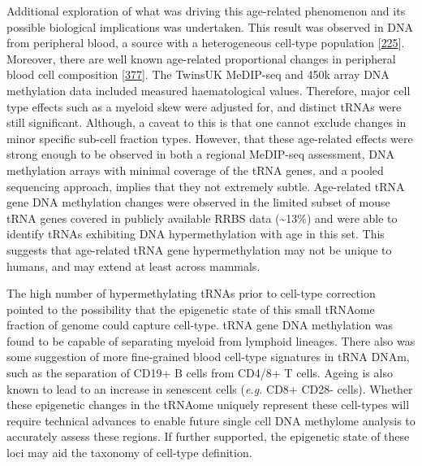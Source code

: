 \documentclass[
]{book}
\begin{document}
Additional exploration of what was driving this age-related phenomenon and its possible biological implications was undertaken.
This result was observed in DNA from peripheral blood, a source with a heterogeneous cell-type population {[}\protect\hyperlink{ref-Lappalainen2017}{225}{]}.
Moreover, there are well known age-related proportional changes in peripheral blood cell composition {[}\protect\hyperlink{ref-Geiger2013}{377}{]}.
The TwinsUK MeDIP-seq and 450k array DNA methylation data included measured haematological values.
Therefore, major cell type effects such as a myeloid skew were adjusted for, and distinct tRNAs were still significant.
Although, a caveat to this is that one cannot exclude changes in minor specific sub-cell fraction types.
However, that these age-related effects were strong enough to be observed in both a regional MeDIP-seq assessment, DNA methylation arrays with minimal coverage of the tRNA genes, and a pooled sequencing approach, implies that they not extremely subtle.
Age-related tRNA gene DNA methylation changes were observed in the limited subset of mouse tRNA genes covered in publicly available RRBS data (\textasciitilde13\%) and were able to identify tRNAs exhibiting DNA hypermethylation with age in this set.
This suggests that age-related tRNA gene hypermethylation may not be unique to humans, and may extend at least across mammals.

The high number of hypermethylating tRNAs prior to cell-type correction pointed to the possibility that the epigenetic state of this small tRNAome fraction of genome could capture cell-type.
tRNA gene DNA methylation was found to be capable of separating myeloid from lymphoid lineages.
There also was some suggestion of more fine-grained blood cell-type signatures in tRNA DNAm, such as the separation of CD19+ B cells from CD4/8+ T cells.
Ageing is also known to lead to an increase in senescent cells (\emph{e.g.} CD8+ CD28- cells).
Whether these epigenetic changes in the tRNAome uniquely represent these cell-types will require technical advances to enable future single cell DNA methylome analysis to accurately assess these regions.
If further supported, the epigenetic state of these loci may aid the taxonomy of cell-type definition.
\end{document}

